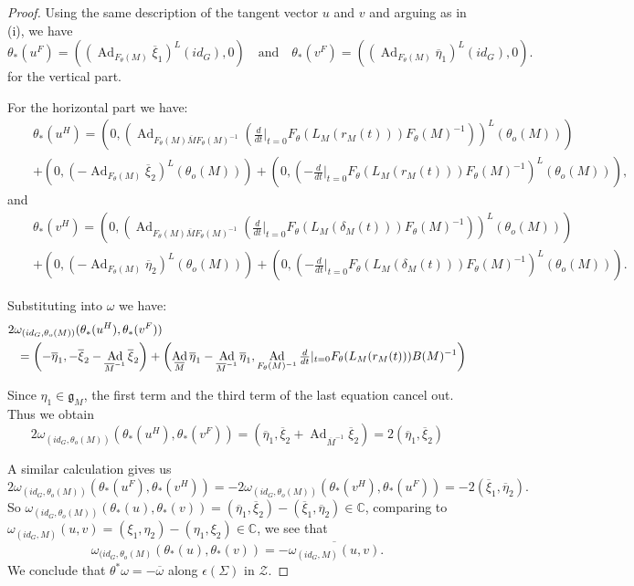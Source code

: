 \documentclass[10pt,a4paper]{amsart}
\DeclareMathOperator{\Ad}{Ad}
\newcommand{\bC}{\mathbb{C}}
\newcommand{\cZ}{\mathcal{Z}}
\newcommand{\fg}{\mathfrak{g}}
\begin{document}
\begin{proof}
Using the same description of the tangent vector $u$ and $v$ and arguing as in (i), we have
\[\theta_*(u^F)=( (\Ad_{F_\theta(M)} \overline{\xi}_1)^L (id_G), 0 )\quad \mbox{and} \quad
\theta_*(v^F)=( (\Ad_{F_\theta(M)}\overline{\eta}_1)^L(id_G),0 ).\]
for the vertical part.

For the horizontal part we have:
\begin{eqnarray*}
&&\theta_*(u^H)=\left( 0, \left( \Ad_{F_\theta(M) \overline{M} F_\theta(M)^{-1}}( \tfrac{d}{dt}|_{t=0}F_\theta(L_M(r_M(t)))F_\theta(M)^{-1}) \right)^L (\theta_o(M) ) \right) \\&&
+ \left( 0, \left( -\Ad_{F_\theta(M)}\overline{\xi}_2 \right)^L(\theta_o(M) ) \right) + \left( 0,\left( -\tfrac{d}{dt}|_{t=0}F_\theta(L_M(r_M(t)))F_\theta(M)^{-1} \right)^L( \theta_o(M) ) \right),
\end{eqnarray*}
and
\begin{eqnarray*}
&&\theta_*(v^H)=\left( 0, \left( \Ad_{F_\theta(M) \overline{M} F_\theta(M)^{-1}}( \tfrac{d}{dt}|_{t=0}F_\theta(L_M(\delta_M(t)))F_\theta(M)^{-1}) \right)^L (\theta_o(M) ) \right) \\&&
+ \left( 0, \left( -\Ad_{F_\theta(M)}\overline{\eta}_2 \right)^L(\theta_o(M) ) \right) + \left( 0,\left( -\tfrac{d}{dt}|_{t=0}F_\theta(L_M(\delta_M(t)))F_\theta(M)^{-1} \right)^L( \theta_o(M) ) \right).
\end{eqnarray*}

Substituting into $\omega$ we have:
\begin{eqnarray*}
\lefteqn{2\omega_{(id_G,\theta_o(M))}(\theta_*(u^H),\theta_*(v^F)) }\\
&&= \left( -\overline{\eta}_1,-\overline{\xi}_2-\Ad_{\overline{M}^{-1}}\overline{\xi}_2 \right)
 + \left( \Ad_{\overline{M}}\overline{\eta}_1-\Ad_{\overline{M}^{-1}}\overline{\eta}_1,\Ad_{F_\theta(M)^{-1}}\tfrac{d}{dt}|_{t=0}F_\theta(L_M(r_M(t)))B(M)^{-1} \right)
\end{eqnarray*}

Since $\eta_1\in\fg_M$, the first term and the third term of the last equation cancel out. Thus we obtain
$$2\omega_{(id_G,\theta_o(M))}(\theta_*(u^H),\theta_*(v^F))=(\overline{\eta}_1,\overline{\xi}_2+\Ad_{\overline{M}^{-1}}\overline{\xi}_2)=2(\overline{\eta}_1,\overline{\xi}_2)$$

A similar calculation gives us
$$2\omega_{(id_G,\theta_o(M))}(\theta_*(u^F),\theta_*(v^H))=-2\omega_{(id_G,\theta_o(M))}(\theta_*(v^H),\theta_*(u^F))=-2(\overline{\xi}_1,\overline{\eta}_2).$$
So $\omega_{(id_G,\theta_o(M))}(\theta_*(u),\theta_*(v))=(\overline{\eta}_1,\overline{\xi}_2)-(\overline{\xi}_1,\overline{\eta}_2)\in\bC$,
comparing to $\omega_{(id_G,M)}(u,v)=(\xi_1,\eta_2)-(\eta_1,\xi_2) \in\bC$, we see that $$\omega_{(id_G,\theta_o(M)}(\theta_*(u),\theta_*(v))=-\overline{\omega_{(id_G,M)}(u,v)}. $$
We conclude that $\theta^*\omega=-\overline{\omega}$ along $\epsilon(\Sigma)$ in $\cZ$.
\end{proof}
\end{document}
